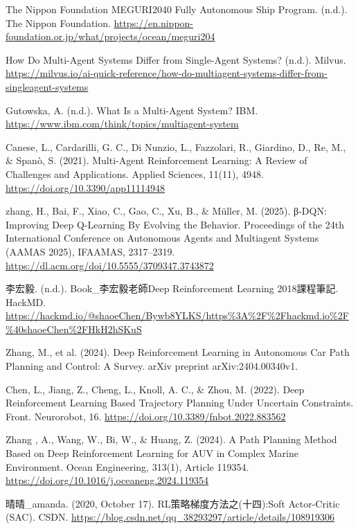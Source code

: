 \documentclass[12pt,a4paper]{article}
\begin{document}
\begin{thebibliography}{9}
The Nippon Foundation MEGURI2040 Fully Autonomous Ship Program. 
(n.d.). 
The Nippon Foundation. 
\url{https://en.nippon-foundation.or.jp/what/projects/ocean/meguri204}

How Do Multi-Agent Systems Differ from Single-Agent Systems? 
(n.d.). 
Milvus. 
\url{https://milvus.io/ai-quick-reference/how-do-multiagent-systems-differ-from-singleagent-systems}

Gutowska, A. 
(n.d.). 
What Is a Multi-Agent System? IBM. 
\url{https://www.ibm.com/think/topics/multiagent-system}

Canese, L., Cardarilli, G. C., Di Nunzio, L., Fazzolari, R., Giardino, D., Re, M., \& Spanò, S. 
(2021). 
Multi-Agent Reinforcement Learning: A Review of Challenges and Applications. Applied Sciences, 11(11), 4948. 
\url{https://doi.org/10.3390/app11114948}

zhang, H., Bai, F., Xiao, C., Gao, C., Xu, B., \& Müller, M. 
(2025). 
β-DQN: Improving Deep Q-Learning By Evolving the Behavior. 
Proceedings of the 24th International Conference on Autonomous Agents and Multiagent Systems (AAMAS 2025), IFAAMAS, 2317–2319. 
\url{https://dl.acm.org/doi/10.5555/3709347.3743872}

李宏毅. 
(n.d.). 
Book\_李宏毅老師Deep Reinforcement Learning 2018課程筆記. HackMD. 
\url{https://hackmd.io/@shaoeChen/Bywb8YLKS/https\%3A\%2F\%2Fhackmd.io\%2F\%40shaoeChen\%2FHkH2hSKuS}

Zhang, M., et al. 
(2024). 
Deep Reinforcement Learning in Autonomous Car Path Planning and Control: A Survey. 
arXiv preprint arXiv:2404.00340v1.

Chen, L., Jiang, Z., Cheng, L., Knoll, A. C., \& Zhou, M.
 (2022). 
Deep Reinforcement Learning Based Trajectory Planning Under Uncertain Constraints. Front. Neurorobot, 16. 
\url{https://doi.org/10.3389/fnbot.2022.883562}

Zhang , A., Wang, W., Bi, W., \& Huang, Z. 
(2024). 
A Path Planning Method Based on Deep Reinforcement Learning for AUV in Complex Marine Environment. Ocean Engineering, 313(1), Article 119354. 
\url{https://doi.org/10.1016/j.oceaneng.2024.119354}

晴晴\_amanda. 
(2020, October 17). 
RL策略梯度方法之(十四):Soft Actor-Critic (SAC). CSDN. 
\url{https://blog.csdn.net/qq_38293297/article/details/108919306}


\end{thebibliography}
\end{document}
